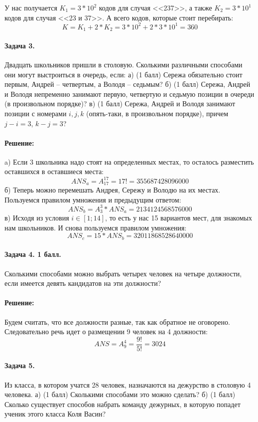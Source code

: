 \documentclass[12pt]{article}
\begin{document}
У нас получается $ K_1 = 3 * 10^2 $ кодов для случая <<237>>, а также
$ K_2 = 3 * 10^1 $ кодов для случая <<23 и 37>>. А всего кодов, которые
стоит перебирать:
$$ K = K_1 + 2 * K_2 = 3 * 10^2 + 2 * 3 * 10^1 = 360 $$



\paragraph{Задача 3.} Двадцать школьников пришли в столовую. 
Сколькими различными способами они могут выстроиться в очередь, если:
а) (1 балл) Сережа обязательно стоит первым, Андрей -- четвертым, а Володя -- 
седьмым? б) (1 балл) Сережа, Андрей и Володя непременно
занимают первую, четвертую и седьмую позиции в очереди (в произвольном
порядке)? в) (1 балл) Сережа, Андрей и Володя занимают позиции с номерами 
$ i,j,k $ (опять-таки, в произвольном порядке), причем 
$ j-i = 3 $, $ k-j=3 $? 

\paragraph{\bf Решение:}
a) Если 3 школьника надо стоят на определенных местах, то осталось разместить
оставшихся в оставшиеся места:
$$ ANS_a = A_{17}^{17} = 17! = 355687428096000 $$
б) Теперь можно перемешать Андрея, Сережу и Володю на их местах. 
Пользуемся правилом умножения и предыдущим ответом:
$$ ANS_b = A_{3}^{3} * ANS_a = 2134124568576000 $$
в) Исходя из условия $ i \in [1; 14] $, то есть у нас 15 вариантов мест, для
знакомых нам школьников. И снова пользуемся правилом умножения:
$$ ANS_c = 15 * ANS_b = 32011868528640000 $$



\paragraph{Задача 4. 1 балл.} Сколькими способами можно выбрать четырех 
человек на четыре должности, если имеется девять кандидатов на эти 
должности? 

\paragraph{\bf Решение:}
Будем считать, что все должности разные, так как обратное не оговорено. Следовательно
речь идет о размещении 9 человек на 4 должности:
$$ ANS = A_{9}^{4} = \frac{9!}{5!} = 3024 $$


\paragraph{Задача 5.} Из класса, в котором учатся 28 человек, 
назначаются на дежурство в столовую 4 человека. а) (1 балл) Сколькими способами 
это можно сделать? б) (1 балл) Сколько существует способов набрать команду 
дежурных, в которую попадет ученик этого класса Коля Васин?
\end{document}
